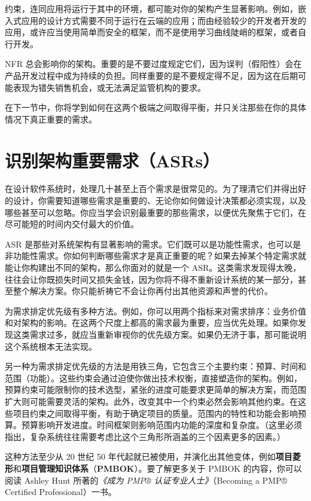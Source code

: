 约束，连同应用将运行于其中的环境，都可能对你的架构产生显著影响。例如，嵌入式应用的设计方式需要不同于运行在云端的应用；而由经验较少的开发者开发的应用，或许应当使用简单而安全的框架，而不是使用学习曲线陡峭的框架，或者自行开发。

\label{idx:153}
\label{idx:154}
NFR 总会影响你的架构。重要的是不要过度规定它们，因为误判（假阳性）会在产品开发过程中成为持续的负担。同样重要的是不要规定得不足，因为这在后期可能表现为错失销售机会，或无法满足监管机构的要求。

在下一节中，你将学到如何在这两个极端之间取得平衡，并只关注那些在你的具体情况下真正重要的需求。

\section{识别架构重要需求（ASRs）}

\label{idx:155}
在设计软件系统时，处理几十甚至上百个需求是很常见的。为了理清它们并得出好的设计，你需要知道哪些需求是重要的、无论你如何做设计决策都必须实现，以及哪些甚至可以忽略。你应当学会识别最重要的那些需求，以便优先聚焦于它们，在尽可能短的时间内交付最大的价值。

ASR 是那些对系统架构有显著影响的需求。它们既可以是功能性需求，也可以是非功能性需求。你如何判断哪些需求才是真正重要的呢？如果去掉某个特定需求就能让你构建出不同的架构，那么你面对的就是一个 ASR。这类需求发现得太晚，往往会让你既损失时间又损失金钱，因为你将不得不重新设计系统的某一部分，甚至整个解决方案。你只能祈祷它不会让你再付出其他资源和声誉的代价。

为需求排定优先级有多种方法。例如，你可以用两个指标来对需求排序：业务价值和对架构的影响。在这两个尺度上都高的需求最为重要，应当优先处理。如果你发现这类需求过多，就应当重新审视你的优先级方案。如果仍无济于事，那可能说明这个系统根本无法实现。

另一种为需求排定优先级的方法是用铁三角，它包含三个主要约束：预算、时间和范围（功能）。这些约束会通过迫使你做出技术权衡，直接塑造你的架构。例如，预算约束可能限制你的技术选型，紧张的进度可能要求更简单的解决方案，而范围扩大则可能需要灵活的架构。此外，改变其中一个约束必然会影响其他约束。在这些项目约束之间取得平衡，有助于确定项目的质量。范围内的特性和功能会影响预算。预算影响开发进度。时间框架则影响范围内功能的深度和复杂度。（这里必须指出，复杂系统往往需要考虑比这个三角形所涵盖的三个因素更多的因素。）

\label{idx:156}
\label{idx:157}
这种方法至少从 20 世纪 50 年代起就已被使用，并演化出其他变体，例如\textbf{项目菱形}和\textbf{项目管理知识体系}（\textbf{PMBOK}）。要了解更多关于 PMBOK 的内容，你可以阅读 Ashley Hunt 所著的\emph{《成为 PMP® 认证专业人士》}（Becoming a PMP® Certified Professional）一书。

